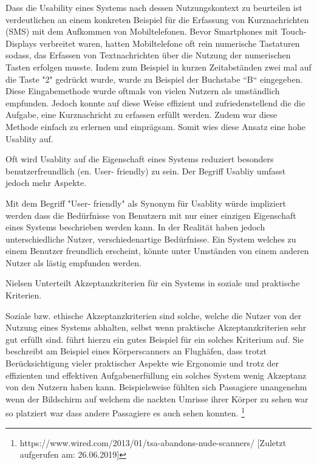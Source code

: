 Dass die Usability eines Systems nach dessen Nutzungskontext zu beurteilen ist verdeutlichen \cite{MichaelRichter2016} an einem konkreten Beispiel für die Erfassung 
von Kurznachrichten (SMS) mit dem Aufkommen von Mobiltelefonen.  Bevor Smartphones mit Touch-Displays verbreitet waren, hatten Mobiltelefone oft rein numerische Tastaturen sodass, das Erfassen 
von Textnachrichten über die Nutzung der numerischen Tasten erfolgen musste. Indem zum Beispiel in kurzen Zeitabständen zwei mal auf die Taste "2" gedrückt wurde, wurde zu Beispiel der Buchstabe ``B`` eingegeben. 
Diese Eingabemethode wurde oftmals von vielen Nutzern als umständlich empfunden. Jedoch konnte auf diese Weise effizient und zufriedenstellend die die Aufgabe, eine Kurznachricht zu erfassen erfüllt werden. 
Zudem war diese Methode einfach zu erlernen und einprägsam. Somit wies diese Ansatz eine hohe Usablity auf. 

\cite{Nielsen1994,RexHartson2012} Oft wird Usablity auf die Eigenschaft eines Systems reduziert besonders benutzerfreundlich (en. User- friendly) zu sein. Der Begriff Usabliy umfasst jedoch mehr Aspekte. 

\cite{Nielsen1994} Mit dem Begriff "User- friendly" als Synonym für Usablity würde impliziert werden dass die Bedürfnisse von Benutzern mit nur einer einzigen Eigenschaft eines Systems beschrieben werden kann. 
In der Realität haben jedoch unterschiedliche Nutzer, verschiedenartige Bedürfnisse. Ein System welches zu einem Benutzer freundlich erscheint, könnte unter Umständen von einem anderen Nutzer als lästig empfunden werden.

Nielsen Unterteilt Akzeptanzkriterien für ein Systems in soziale und praktische Kriterien.

Soziale bzw. ethische Akzeptanzkriterien sind solche, welche  die Nutzer von der Nutzung eines Systems abhalten, selbst wenn praktische Akzeptanzkriterien sehr gut erfüllt sind. 
\cite[p.~285]{Spiekermann2016} führt hierzu ein gutes Beispiel für ein solches Kriterium auf. Sie beschreibt am Beispiel eines Körperscanners an Flughäfen, dass trotzt  Berücksichtigung vieler 
praktischer Aspekte wie Ergonomie und trotz der effizienten und effektiven Aufgabenerfüllung ein solches System wenig Akzeptanz von den Nutzern haben kann. Beispielsweise fühlten sich Passagiere 
unangenehm wenn der Bildschirm auf welchem die nackten Umrisse ihrer Körper zu sehen war so platziert war dass andere Passagiere es auch sehen konnten.  
\footnote[3]{https://www.wired.com/2013/01/tsa-abandons-nude-scanners/ [Zuletzt aufgerufen am: 26.06.2019]}

